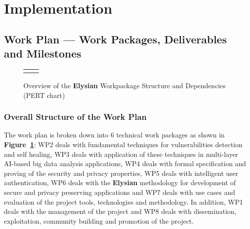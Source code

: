 \documentclass[a4paper,11pt]{article}
\newcommand{\project}[1]{\textbf{#1}\xspace}
\newcommand{\SECURITY}{\project{Elysian}}
\newcommand{\TheProject}{\SECURITY}
\begin{document}
\clearpage
\section{Implementation}

\subsection{Work Plan --- Work Packages, Deliverables and Milestones}
\label{sect:workplan}


\begin{figure}[tp]
\begin{center}
\vspace{-5mm}
\begin{tabular}{ll}
\hspace{-0.75in}
[scale=0.5]{PertChart.pdf}
\vspace{-10mm}
\end{tabular}
\caption{Overview of the \TheProject{} Workpackage Structure and Dependencies (PERT chart)}
\label{fig:wps}
\end{center}
\end{figure}

\subsubsection*{Overall Structure of the Work Plan}

The work plan is broken down into 6 technical work packages as shown
in \textbf{Figure~\ref{fig:wps}}: WP2 deals with fundamental techniques for vulnerabilities detection and self healing, WP3 deals with application of these techniques in multi-layer AI-based big data analysis applications, WP4 deals with formal specification and proving of the security and privacy properties, WP5 deals with intelligent user authentication, WP6 deals with the \TheProject{} methodology for development of secure and privacy preserving applications and WP7 deals with use cases and evaluation of the project tools, technologies and methodology. In addition, WP1 deals with the management of the project and WP8 deals with dissemination, exploitation, community building and promotion of the project.



\bigskip\bigskip
\addtocounter{subsubsection}{1}
\fbox{\begin{minipage}{\textwidth}\begin{center}{\Large\bf
        Work package list} %
  \end{center}
  \end{minipage}}
\end{document}
